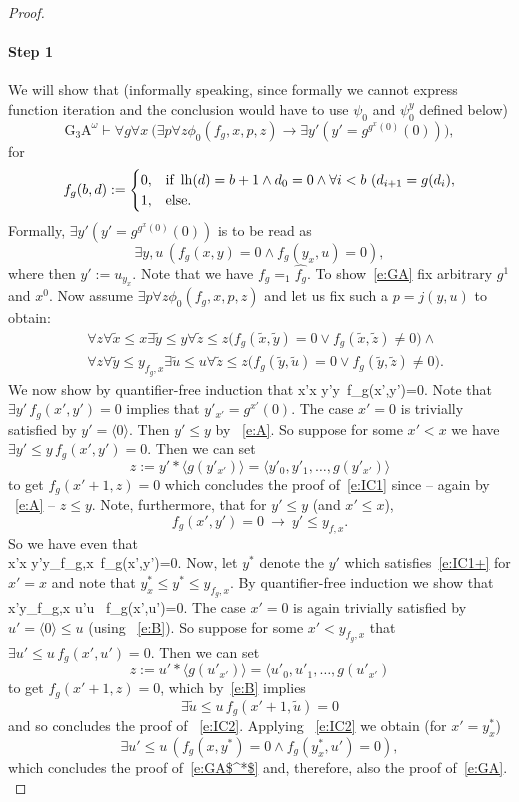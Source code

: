 \begin{proof}
\paragraph{Step 1} We will show that (informally speaking, since 
formally we cannot express function iteration and the conclusion would have to use $\psi_0$ and $\psi^y_0$ defined below)
\[
\mbox{G$_3$A}^\omega\vdash \forall g \forall x\ \big(\exists p\forall z\phi_0(f_g,x,p,z)\rightarrow \exists y'(y'=g^{g^{x}(0)}(0))\big),
\tag{GA}\label{e:GA}
\]
for \[
f_g(b,d):=\begin{cases}
0,&\Tif \ \lh(d) = b+1 \wedge d_0=0\wedge \forall i< b\ (d_{i+1}=g(d_i),\\
1,&\Telse.
\end{cases}
\]
Formally, $\exists y' (y'=g^{g^x(0)}(0))$ is to be read as 
\[ \exists y,u \, (f_g(x,y)=0\wedge f_g(y_x,u)=0),
\tag{GA$^*$}\label{e:GA$^*$} \] 
where then $y':=u_{y_x}.$  
Note that we have $f_g=_1\widehat{f_g}$. To show~\eqref{e:GA} fix arbitrary $g^1$ and $x^0$.
Now assume $\exists p\forall z\phi_0(f_g,x,p,z)$ and let us fix such 
a $p=j(y,u)$ to obtain:
\begin{align}
&\forall z\forall\tilde x \leq x \exists \tilde y\leq y \forall \tilde z\leq z 
\big(f_g(\tilde x,\tilde y)=0\vee f_g(\tilde x,\tilde z)\neq0\big) \label{e:A}
\wedge \\
&\forall z\forall\tilde y \leq y_{f_g,x} \exists \tilde u\leq u \forall \tilde z\leq z 
\big(f_g(\tilde y,\tilde u)=0\vee f_g(\tilde y,\tilde z)\neq0\big). \label {e:B}
\end{align}
We now show by quantifier-free induction that 
\be[e:IC1]
\forall x'\leq x \exists y'\leq y\ f_g(x',y')=0.
\ee
Note that $\exists y'\,f_g(x',y')=0$ implies that $y'_{x'}=g^{x'}(0).$ 
The case $x'=0$ is trivially satisfied by $y'=\langle 0 \rangle$. Then 
$y'\le y$ by ~\eqref{e:A}. So suppose for some $x'<x$ we have
$\exists y'\leq y\,f_g(x',y')=0.$ Then we can set 
\[
z:=y'*\langle g(y'_{x'}) \rangle =\langle y'_0,y'_1,\ldots,g(y'_{x'})\rangle
\] to get $f_g(x'+1,z)=0$
which concludes the proof of~\eqref{e:IC1} since -- again by 
~\eqref{e:A} -- $z\le y.$ Note, furthermore,
that for $y'\leq y$ (and $x'\leq x$),
\[ f_g(x',y')=0\ \rightarrow\ y'\leq y_{f,x}.\] 
So we have even that \\
\be[e:IC1+]
\forall x'\leq x \exists y'\leq y_{f_g,x}\, f_g(x',y')=0.
\ee
Now, let $y^*$ denote the $y'$ which satisfies~\eqref{e:IC1+} for $x'=x$ and 
note that $y^*_x\le y^*\le y_{f_g,x}.$ 
By quantifier-free induction we show that 
\be[e:IC2]\forall x'\leq y_{f_g,x} \exists u'\leq u \, f_g(x',u')=0.\ee
The case $x'=0$ is again trivially satisfied by $u'=\langle 0 \rangle \le u$ 
(using ~\eqref{e:B}). 
So suppose for some $x'< y_{f_g,x}$ that
$\exists u'\leq u \,f_g(x',u')=0$. Then we can set
\[z:=u'*\langle g(u'_{x'})\rangle= \langle u'_0,u'_1,\ldots,g(u'_{x'})\] to get $f_g(x'+1,z)=0$,
which by~\eqref{e:B} implies 
\[\exists \tilde u\leq u \,f_g(x'+1, \tilde u)=0\]
and so concludes the proof of ~\eqref{e:IC2}. Applying ~\eqref{e:IC2} 
we obtain (for $x'=y^*_x$)
\[
\exists u'\leq u\, (f_g(x,y^*)=0\wedge f_g(y^*_x,u')=0),
\]
which concludes the proof of~\eqref{e:GA$^*$} and, therefore, 
also the proof of~\eqref{e:GA}.\\

\end{proof}
